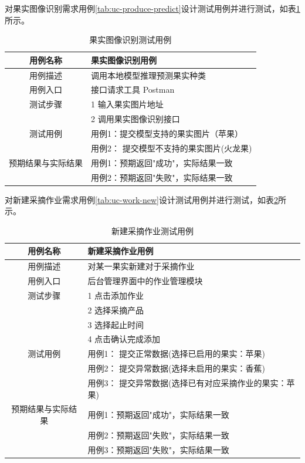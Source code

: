 对果实图像识别需求用例\ref{tab:uc-produce-predict}设计测试用例并进行测试，如表\ref{tab:uc-produce-predict-test}所示。

\begin{longtable}[ht]{|c|p{8cm}|}
\caption{果实图像识别测试用例}
\label{tab:uc-produce-predict-test}
\\
\hline
用例名称 & 果实图像识别用例 \\
\hline
用例描述 & 调用本地模型推理预测果实种类 \\
\hline
用例入口 & 接口请求工具 Postman \\
\hline
测试步骤 & 1 输入果实图片地址 \\
& 2 调用果实图像识别接口 \\
\hline
测试用例 & 用例1：提交模型支持的果实图片（苹果） \\
& 用例2： 提交模型不支持的果实图片(火龙果) \\
\hline
预期结果与实际结果 & 用例1：预期返回"成功"，实际结果一致 \\
& 用例2：预期返回"失败"，实际结果一致 \\
\hline
\end{longtable}

对新建采摘作业需求用例\ref{tab:uc-work-new}设计测试用例并进行测试，如表\ref{tab:uc-work-new-test}所示。

\begin{longtable}[ht]{|c|p{8cm}|}
\caption{新建采摘作业测试用例}
\label{tab:uc-work-new-test}
\\
\hline
用例名称 & 新建采摘作业用例 \\
\hline
用例描述 & 对某一果实新建对于采摘作业 \\
\hline
用例入口 & 后台管理界面中的作业管理模块 \\
\hline
测试步骤 & 1 点击添加作业 \\
& 2 选择采摘产品 \\
& 3 选择起止时间 \\
& 4 点击确认完成添加 \\
\hline
测试用例 & 用例1： 提交正常数据(选择已启用的果实：苹果) \\
& 用例2： 提交异常数据(选择未启用的果实：香蕉) \\
& 用例3： 提交异常数据(选择已有对应采摘作业的果实：苹果) \\
\hline
预期结果与实际结果 & 用例1：预期返回"成功"，实际结果一致 \\
& 用例2：预期返回"失败"，实际结果一致 \\
& 用例3：预期返回"失败"，实际结果一致 \\
\hline
\end{longtable}


